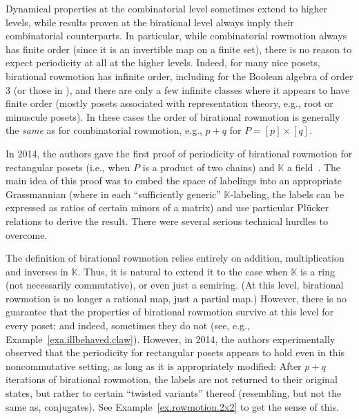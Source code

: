 \documentclass[numbers=enddot,12pt,final,onecolumn,notitlepage]{scrartcl}%
\theoremstyle{definition}
\begin{document}
Dynamical properties at the combinatorial level sometimes extend to higher
levels, while results proven at the birational level always imply their
combinatorial counterparts. In particular, while combinatorial rowmotion
always has finite order (since it is an invertible map on a finite set), there
is no reason to expect periodicity at all at the higher levels. Indeed, for
many nice posets, birational rowmotion has infinite order, including for the
Boolean algebra of order 3 (or those in \cite[Fig.~6]{Roby15}), and there are
only a few infinite classes where it appears to have finite order (mostly
posets associated with representation theory, e.g., root or minuscule posets).
In these cases the order of birational rowmotion is generally the \emph{same}
as for combinatorial rowmotion, e.g., $p+q$ for $P=[p]\times[q]$.


In 2014, the authors gave the first proof of periodicity of birational
rowmotion for rectangular posets (i.e., when $P$ is a product of two chains)
and $\mathbb{K}$ a field~\cite{bir-row-arxiv}. The main idea of this proof was
to embed the space of labelings into an appropriate Grassmannian (where in
each ``sufficiently generic'' $\mathbb{K}$-labeling, the labels can be
expressed as ratios of certain minors of a matrix) and use particular
Pl\"ucker relations to derive the result. There were several serious technical
hurdles to overcome.

The definition of birational rowmotion relies entirely on addition,
multiplication and inverses in $\mathbb{K}$. Thus, it is natural to extend it
to the case when $\mathbb{K}$ is a ring (not necessarily commutative), or even
just a semiring. (At this level, birational rowmotion is no longer a rational
map, just a partial map.) However, there is no guarantee that the properties
of birational rowmotion survive at this level for every poset; and indeed,
sometimes they do not (see, e.g., Example~\ref{exa.illbehaved.claw}). However,
in 2014, the authors experimentally observed that the periodicity for
rectangular posets appears to hold even in this noncommutative setting, as
long as it is appropriately modified: After $p+q$ iterations of birational
rowmotion, the labels are not returned to their original states, but rather to
certain ``twisted variants'' thereof (resembling, but not the same as,
conjugates). See Example~\ref{ex.rowmotion.2x2} to get the sense of this.
\end{document}
